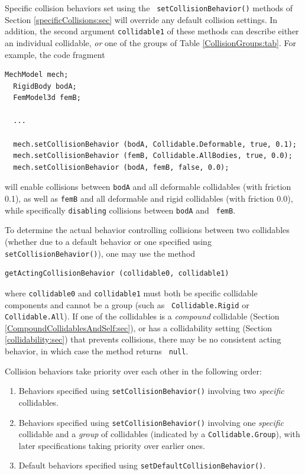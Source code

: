 Specific collision behaviors set using the {\tt
setCollisionBehavior()} methods of Section \ref{specificCollisions:sec}
will override any default collision settings. In addition, the second
argument {\tt collidable1} of these methods can describe either an
individual collidable, {\it or} one of the groups of Table
\ref{CollisionGroups:tab}. For example, the code fragment
\begin{lstlisting}[]
  MechModel mech;
  RigidBody bodA; 
  FemModel3d femB;

  ...

  mech.setCollisionBehavior (bodA, Collidable.Deformable, true, 0.1);
  mech.setCollisionBehavior (femB, Collidable.AllBodies, true, 0.0);
  mech.setCollisionBehavior (bodA, femB, false, 0.0);
\end{lstlisting}
will enable collisions between {\tt bodA} and all deformable
collidables (with friction 0.1), as well as {\tt femB} and all
deformable and rigid collidables (with friction 0.0), while
specifically {\tt disabling} collisions between {\tt bodA} and {\tt
femB}.

To determine the actual behavior controlling collisions between two
collidables (whether due to a default behavior or one specified using
{\tt setCollisionBehavior()}), 
one may use the method
%
\begin{lstlisting}[]
  getActingCollisionBehavior (collidable0, collidable1)
\end{lstlisting}
%
where {\tt collidable0} and {\tt collidable1} must both be specific
collidable components and cannot be a group (such as {\tt
Collidable.Rigid} or {\tt Collidable.All}).  If one of the collidables
is a {\it compound} collidable (Section
\ref{CompoundCollidablesAndSelf:sec}), or has a collidability setting (Section
\ref{collidability:sec}) that prevents collisions, there may be no
consistent acting behavior, in which case the method returns {\tt
null}.

Collision behaviors take priority over each other in the following
order:

\begin{enumerate}

\item Behaviors specified using {\tt setCollisionBehavior()} involving
two {\it specific} collidables.

\item Behaviors specified using {\tt setCollisionBehavior()} involving
one {\it specific} collidable and a {\it group} of collidables
(indicated by a {\tt Collidable.Group}), with later specifications
taking priority over earlier ones.

\item Default behaviors specified using {\tt setDefaultCollisionBehavior()}.

\end{enumerate}

